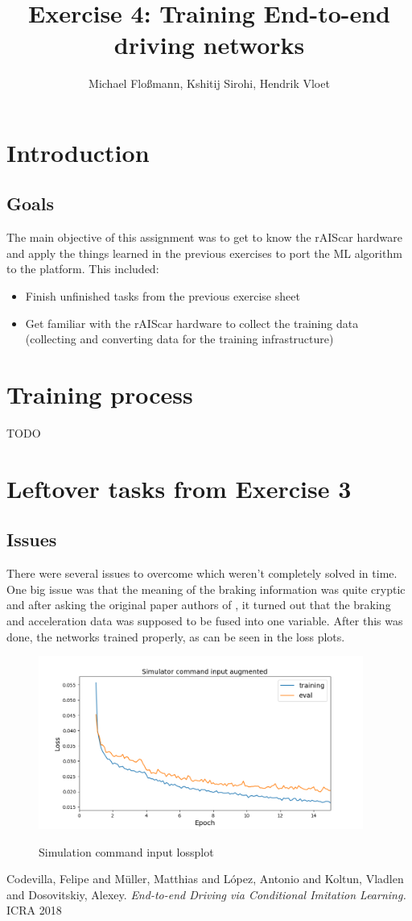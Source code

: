 \documentclass[a4paper]{article}
\title{Exercise 4: Training End-to-end driving networks}
\author{Michael Floßmann, Kshitij Sirohi, Hendrik Vloet}
\begin{document}
\maketitle

\section{Introduction}
\subsection{Goals}
The main objective of this assignment was to get to know the rAIScar hardware
and apply the things learned in the previous exercises to port the ML algorithm
to the platform. This included:
\begin{itemize}
\item Finish unfinished tasks from the previous exercise sheet
\item Get familiar with the rAIScar hardware to collect the training data
  (collecting and converting data for the training infrastructure)
\end{itemize} 

\section{Training process}
TODO

\section{Leftover tasks from Exercise 3}

\subsection{Issues}
There were several issues to overcome which weren't completely solved in time.
One big issue was that the meaning of the braking information was quite cryptic
and after asking the original paper authors of \cite{imitation}, it turned out
that the braking and acceleration data was supposed to be fused into one
variable. After this was done, the networks trained properly, as can be seen in
the loss plots.  %

\begin{figure}[!htbp]
  \centering
  \includegraphics[width=0.95\textwidth]{figures/sim_command_input_aug_lossplot}
  \label{fig:augmented_command_loss}
  \caption{Simulation command input lossplot}
\end{figure}
	
\begin{thebibliography}{9}
Codevilla, Felipe and Müller, Matthias and López, Antonio and Koltun, Vladlen
and Dosovitskiy, Alexey.
\textit{End-to-end Driving via Conditional Imitation Learning.}
ICRA 2018
\end{thebibliography}
\end{document}
